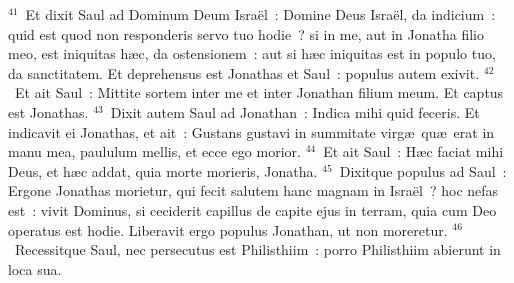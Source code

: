 ${}^{41}$~Et dixit Saul ad Dominum Deum Isra\"el~: Domine Deus Isra\"el, da indicium~: quid est quod non responderis servo tuo hodie~? si in me, aut in Jonatha filio meo, est iniquitas h\ae c, da ostensionem~: aut si h\ae c iniquitas est in populo tuo, da sanctitatem. Et deprehensus est Jonathas et Saul~: populus autem exivit.
${}^{42}$~Et ait Saul~: Mittite sortem inter me et inter Jonathan filium meum. Et captus est Jonathas.
${}^{43}$~Dixit autem Saul ad Jonathan~: Indica mihi quid feceris. Et indicavit ei Jonathas, et ait~: Gustans gustavi in summitate virg\ae\ qu\ae\ erat in manu mea, paululum mellis, et ecce ego morior.
${}^{44}$~Et ait Saul~: H\ae c faciat mihi Deus, et h\ae c addat, quia morte morieris, Jonatha.
${}^{45}$~Dixitque populus ad Saul~: Ergone Jonathas morietur, qui fecit salutem hanc magnam in Isra\"el~? hoc nefas est~: vivit Dominus, si ceciderit capillus de capite ejus in terram, quia cum Deo operatus est hodie. Liberavit ergo populus Jonathan, ut non moreretur.
${}^{46}$~Recessitque Saul, nec persecutus est Philisthiim~: porro Philisthiim abierunt in loca sua.



